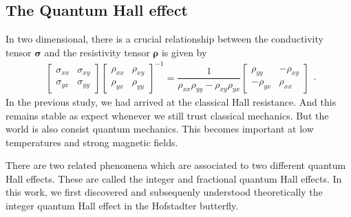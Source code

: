 \documentclass{report}
\newcommand{\f}[2]{\dfrac{#1}{#2}}
\begin{document}
\subsection{The Quantum Hall effect}
In two dimensional, there is a crucial relationship between the conductivity tensor $\boldsymbol{\sigma}$ and the resistivity tensor $\boldsymbol{\rho}$ is given by
\begin{equation}
	\begin{aligned}
		\begin{bmatrix}
			\sigma_{xx} & \sigma_{xy} \\
			\sigma_{yx} & \sigma_{yy}
		\end{bmatrix}
		\begin{bmatrix}
			\rho_{xx} & \rho_{xy} \\
			\rho_{yx} & \rho_{yy}
		\end{bmatrix}^{-1}
		=
		\f{1}{\rho_{xx} \rho_{yy} - \rho_{xy} \rho_{yx}}
		\begin{bmatrix}
			\rho_{yy}  & -\rho_{xy} \\
			-\rho_{yx} & \rho_{xx}
		\end{bmatrix}
	\end{aligned}.
\end{equation}
In the previous study, we had arrived at the classical Hall resistance. And this remains stable as expect whenever we still trust classical mechanics. But the world is also consist quantum mechanics. This becomes important at low temperatures and strong magnetic fields.

There are two related phenomena which are associated to two different quantum Hall effects. These are called the integer and fractional quantum Hall effects. In this work, we first discovered and subsequenly understood theoretically the integer quantum Hall effect in the Hofstadter butterfly.
\end{document}

